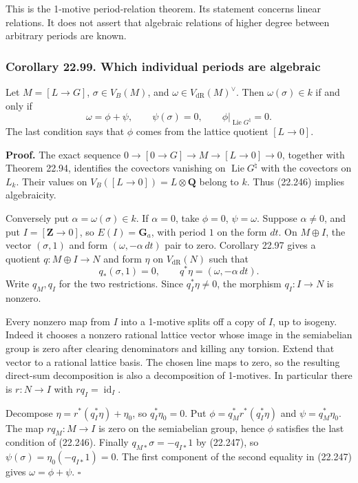 \documentclass[
  11pt,
  a4paper,
]{article}
\begin{document}
This is the 1-motive period-relation theorem. Its statement concerns
linear relations. It does not assert that algebraic relations of higher
degree between arbitrary periods are known.

\subsubsection{Corollary 22.99. Which individual periods are
algebraic}\label{corollary-22.99.-which-individual-periods-are-algebraic}

Let \(M=[L\to G]\), \(\sigma\in V_B(M)\), and
\(\omega\in V_{\mathrm{dR}}(M)^\vee\). Then \(\omega(\sigma)\in k\) if
and only if \[
 \omega=\phi+\psi,\qquad \psi(\sigma)=0,\qquad
 \phi|_{\operatorname{Lie}G^\natural}=0.
 \tag{22.246}
\] The last condition says that \(\phi\) comes from the lattice quotient
\([L\to0]\).

\textbf{Proof.} The exact sequence \(0\to[0\to G]\to M\to[L\to0]\to0\),
together with Theorem 22.94, identifies the covectors vanishing on
\(\operatorname{Lie}G^\natural\) with the covectors on \(L_k\). Their
values on \(V_B([L\to0])=L\otimes\mathbf Q\) belong to \(k\). Thus
(22.246) implies algebraicity.

Conversely put \(\alpha=\omega(\sigma)\in k\). If \(\alpha=0\), take
\(\phi=0\), \(\psi=\omega\). Suppose \(\alpha\ne0\), and put
\(I=[\mathbf Z\to0]\), so \(E(I)=\mathbf G_a\), with period \(1\) on the
form \(dt\). On \(M\oplus I\), the vector \((\sigma,1)\) and form
\((\omega,-\alpha\,dt)\) pair to zero. Corollary 22.97 gives a quotient
\(q:M\oplus I\to N\) and form \(\eta\) on \(V_{\mathrm{dR}}(N)\) such
that \[
 q_*(\sigma,1)=0,\qquad
 q^*\eta=(\omega,-\alpha\,dt).
 \tag{22.247}
\] Write \(q_M,q_I\) for the two restrictions. Since \(q_I^*\eta\ne0\),
the morphism \(q_I:I\to N\) is nonzero.

Every nonzero map from \(I\) into a 1-motive splits off a copy of \(I\),
up to isogeny. Indeed it chooses a nonzero rational lattice vector whose
image in the semiabelian group is zero after clearing denominators and
killing any torsion. Extend that vector to a rational lattice basis. The
chosen line maps to zero, so the resulting direct-sum decomposition is
also a decomposition of 1-motives. In particular there is \(r:N\to I\)
with \(rq_I=\operatorname{id}_I\).

Decompose \(\eta=r^*(q_I^*\eta)+\eta_0\), so \(q_I^*\eta_0=0\). Put
\(\phi=q_M^*r^*(q_I^*\eta)\) and \(\psi=q_M^*\eta_0\). The map
\(rq_M:M\to I\) is zero on the semiabelian group, hence \(\phi\)
satisfies the last condition of (22.246). Finally
\(q_{M*}\sigma=-q_{I*}1\) by (22.247), so
\(\psi(\sigma)=\eta_0(-q_{I*}1)=0\). The first component of the second
equality in (22.247) gives \(\omega=\phi+\psi\). \(\square\)
\end{document}
